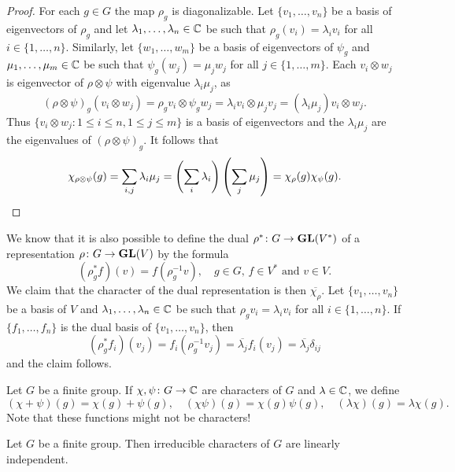 \begin{proof}
	For each $g\in G$ the map $\rho_g$ is diagonalizable. Let $\{v_1,\dots,v_n\}$
	be a basis of eigenvectors of $\rho_g$ and let $\lambda_1,\dots,\lambda_n\in\mathbb{C}$ be such that
	$\rho_g(v_i)=\lambda_iv_i$ for all $i\in\{1,\dots,n\}$. Similarly, 
	let $\{w_1,\dots,w_m\}$ be a basis of 
	eigenvectors of $\psi_g$ and $\mu_1,\dots,\mu_m\in\mathbb{C}$ be such that $\psi_g(w_j)=\mu_jw_j$ for all $j\in\{1,\dots,m\}$. Each 
	$v_i\otimes w_j$ is eigenvector of $\rho\otimes\psi$ with eigenvalue 
	$\lambda_i\mu_j$, as  
	\[
		(\rho\otimes\psi)_g(v_i\otimes w_j)=\rho_gv_i\otimes \psi_gw_j=\lambda_iv_i\otimes \mu_jv_j=(\lambda_i\mu_j)v_i\otimes w_j.
	\]
	Thus  
	$\{v_i\otimes w_j:1\leq i\leq n,1\leq j\leq m\}$ is a basis of eigenvectors and the 
	$\lambda_i\mu_j$ are the eigenvalues of $(\rho\otimes\psi)_g$. It follows that 
	\[
	\chi_{\rho\otimes\psi}(g)
	=\sum_{i,j}\lambda_i\mu_j
	=\left(\sum_i\lambda_i\right)\left(\sum_j\mu_j\right)
	=\chi_\rho(g)\chi_\psi(g).\qedhere 
	\]
\end{proof}

We know that
it is also possible to define the dual $\rho^*\colon G\to\mathbf{GL}(V^*)$  
of a representation
$\rho\colon G\to\mathbf{GL}(V)$ by the formula
\[
(\rho^*_gf)(v)=f(\rho^{-1}_gv),\quad
g\in G,\,f\in V^*\text{ and }v\in V.
\]  
We claim that the character of the dual representation is then 
$\overline{\chi_\rho}$. Let $\{v_1,\dots,v_n\}$ be a basis of $V$
and $\lambda_1,\dots,\lambda_n\in\mathbb{C}$ be such that $\rho_gv_i=\lambda_iv_i$ for all $i\in\{1,\dots,n\}$. If $\{f_1,\dots,f_n\}$ is the dual basis of $\{v_1,\dots,v_n\}$, then 
\[
(\rho^*_gf_i)(v_j)=f_i(\rho_g^{-1}v_j)
=\overline{\lambda_j}f_i(v_j)
=\overline{\lambda_j}\delta_{ij}
\]
and the claim follows. 

Let $G$ be a finite group. If $\chi,\psi\colon G\to\mathbb{C}$ are
characters of $G$ and $\lambda\in\mathbb{C}$, we define 
\[
    (\chi+\psi)(g)=\chi(g)+\psi(g),
    \quad
    (\chi\psi)(g)=\chi(g)\psi(g),
    \quad
    (\lambda\chi)(g)=\lambda\chi(g).
\]
Note that these functions might not be characters!

\begin{theorem}
    Let $G$ be a finite group. Then irreducible characters of $G$
    are linearly independent. 
\end{theorem}

